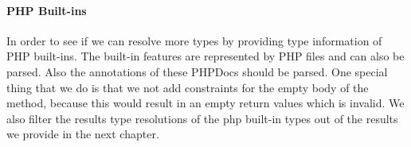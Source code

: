 \documentclass[../main.tex]{subfiles}
\begin{document}
    \paragraph{PHP Built-ins}
    In order to see if we can resolve more types by providing type information of PHP built-ins.
    The built-in features are represented by PHP files and can also be parsed.
    Also the annotations of these PHPDocs should be parsed.
    One special thing that we do is that we not add constraints for the empty body of the method, because this would result in an empty return values which is invalid.
    We also filter the results type resolutions of the php built-in types out of the results we provide in the next chapter.
\end{document}
